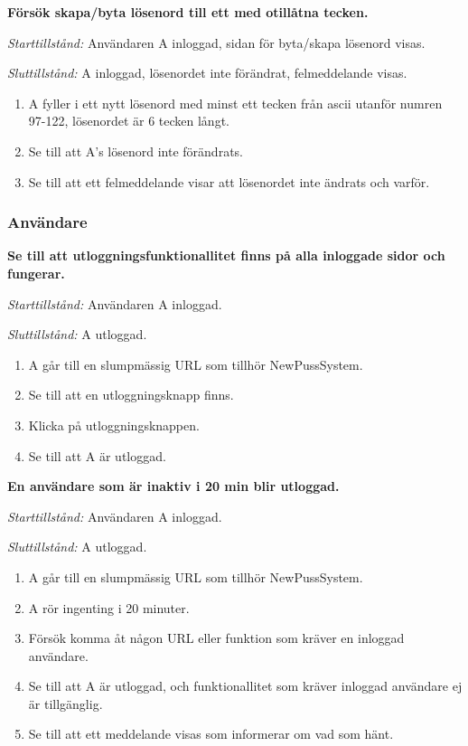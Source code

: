 \documentclass[a4paper]{article}
\begin{document}
\begin{FT}
\item
\textbf{Försök skapa/byta lösenord till ett med otillåtna tecken.}

\emph{Starttillstånd:} Användaren A inloggad, sidan för byta/skapa lösenord visas.

\emph{Sluttillstånd:} A inloggad, lösenordet inte förändrat, felmeddelande visas.

\begin{enumerate}
\item A fyller i ett nytt lösenord med minst ett tecken från ascii utanför numren 97-122, lösenordet är 6 tecken långt.
\item Se till att A's lösenord inte förändrats.
\item Se till att ett felmeddelande visar att lösenordet inte ändrats och varför.
\end{enumerate}

\end{FT}

\subsubsection{Användare}
\begin{FT}
\item
\textbf{Se till att utloggningsfunktionallitet finns på alla inloggade sidor och fungerar.}

\emph{Starttillstånd:} Användaren A inloggad.

\emph{Sluttillstånd:} A utloggad.

\begin{enumerate}
\item A går till en slumpmässig URL som tillhör NewPussSystem.
\item Se till att en utloggningsknapp finns.
\item Klicka på utloggningsknappen.
\item Se till att A är utloggad.
\end{enumerate}

\item
\textbf{En användare som är inaktiv i 20 min blir utloggad.}

\emph{Starttillstånd:} Användaren A inloggad.

\emph{Sluttillstånd:} A utloggad.

\begin{enumerate}
\item A går till en slumpmässig URL som tillhör NewPussSystem.
\item A rör ingenting i 20 minuter.
\item Försök komma åt någon URL eller funktion som kräver en inloggad användare.
\item Se till att A är utloggad, och funktionallitet som kräver inloggad användare ej är tillgänglig.
\item Se till att ett meddelande visas som informerar om vad som hänt.
\end{enumerate}
\end{FT}
\end{document}
